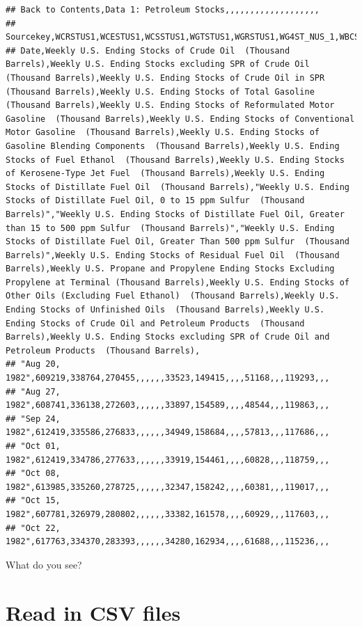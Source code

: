 \documentclass[
]{book}
\begin{document}
\begin{verbatim}
## Back to Contents,Data 1: Petroleum Stocks,,,,,,,,,,,,,,,,,,,
## Sourcekey,WCRSTUS1,WCESTUS1,WCSSTUS1,WGTSTUS1,WGRSTUS1,WG4ST_NUS_1,WBCSTUS1,W_EPOOXE_SAE_NUS_MBBL,WKJSTUS1,WDISTUS1,WD0ST_NUS_1,WD1ST_NUS_1,WDGSTUS1,WRESTUS1,WPRSTUS1,W_EPPO6_SAE_NUS_MBBL,WUOSTUS1,WTTSTUS1,WTESTUS1,
## Date,Weekly U.S. Ending Stocks of Crude Oil  (Thousand Barrels),Weekly U.S. Ending Stocks excluding SPR of Crude Oil  (Thousand Barrels),Weekly U.S. Ending Stocks of Crude Oil in SPR  (Thousand Barrels),Weekly U.S. Ending Stocks of Total Gasoline  (Thousand Barrels),Weekly U.S. Ending Stocks of Reformulated Motor Gasoline  (Thousand Barrels),Weekly U.S. Ending Stocks of Conventional Motor Gasoline  (Thousand Barrels),Weekly U.S. Ending Stocks of Gasoline Blending Components  (Thousand Barrels),Weekly U.S. Ending Stocks of Fuel Ethanol  (Thousand Barrels),Weekly U.S. Ending Stocks of Kerosene-Type Jet Fuel  (Thousand Barrels),Weekly U.S. Ending Stocks of Distillate Fuel Oil  (Thousand Barrels),"Weekly U.S. Ending Stocks of Distillate Fuel Oil, 0 to 15 ppm Sulfur  (Thousand Barrels)","Weekly U.S. Ending Stocks of Distillate Fuel Oil, Greater than 15 to 500 ppm Sulfur  (Thousand Barrels)","Weekly U.S. Ending Stocks of Distillate Fuel Oil, Greater Than 500 ppm Sulfur  (Thousand Barrels)",Weekly U.S. Ending Stocks of Residual Fuel Oil  (Thousand Barrels),Weekly U.S. Propane and Propylene Ending Stocks Excluding Propylene at Terminal (Thousand Barrels),Weekly U.S. Ending Stocks of Other Oils (Excluding Fuel Ethanol)  (Thousand Barrels),Weekly U.S. Ending Stocks of Unfinished Oils  (Thousand Barrels),Weekly U.S. Ending Stocks of Crude Oil and Petroleum Products  (Thousand Barrels),Weekly U.S. Ending Stocks excluding SPR of Crude Oil and Petroleum Products  (Thousand Barrels),
## "Aug 20, 1982",609219,338764,270455,,,,,,33523,149415,,,,51168,,,119293,,,
## "Aug 27, 1982",608741,336138,272603,,,,,,33897,154589,,,,48544,,,119863,,,
## "Sep 24, 1982",612419,335586,276833,,,,,,34949,158684,,,,57813,,,117686,,,
## "Oct 01, 1982",612419,334786,277633,,,,,,33919,154461,,,,60828,,,118759,,,
## "Oct 08, 1982",613985,335260,278725,,,,,,32347,158242,,,,60381,,,119017,,,
## "Oct 15, 1982",607781,326979,280802,,,,,,33382,161578,,,,60929,,,117603,,,
## "Oct 22, 1982",617763,334370,283393,,,,,,34280,162934,,,,61688,,,115236,,,
\end{verbatim}

What do you see?

\hypertarget{read-in-csv-files}{%
\section{Read in CSV files}\label{read-in-csv-files}}
\end{document}
